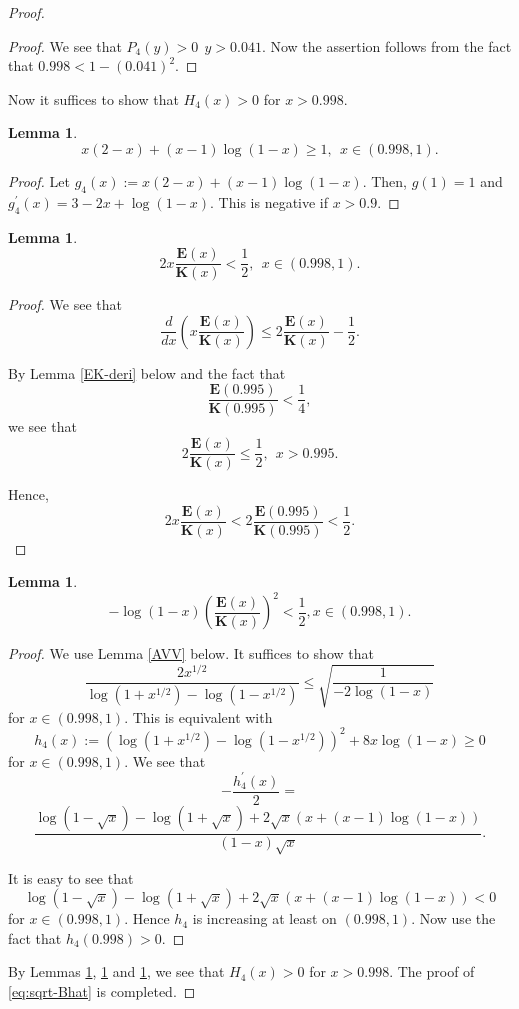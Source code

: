 \documentclass[journal]{IEEEtran}
\newtheorem{lemma}[theorem]{Lemma}
\begin{document}
\begin{proof}
\begin{proof}
We see that 
$
P_4 (y) > 0 \ \ y > 0.041.
$
Now the assertion follows from the fact that 
$0.998 < 1 - (0.041)^{2}$.
\end{proof}

Now it suffices to show that $H_4 (x) > 0$ for $x > 0.998$. 


\begin{lemma}\label{lem:1st}
\[ x(2-x) + (x-1)\log(1-x) \ge 1, \ \ x \in (0.998,1). \]
\end{lemma}

\begin{proof}
Let $g_4(x) := x(2-x) + (x-1)\log(1-x)$. 
Then, $g(1) = 1$ and 
$g_4^{\prime}(x) = 3-2x + \log(1-x)$. 
This is negative if $x > 0.9$. 
\end{proof}

\begin{lemma}\label{lem:2nd}
\[ 2x \frac{\mathbf{E}(x)}{\mathbf{K}(x)} < \frac{1}{2}, \ \ x \in (0.998,1). \]
\end{lemma}

\begin{proof}
We see that 
\[ \frac{d}{dx} \left( x \frac{\mathbf{E}(x)}{\mathbf{K}(x)}\right) \le  2\frac{\mathbf{E}(x)}{\mathbf{K}(x)}  -\frac{1}{2}. \]

By Lemma \ref{EK-deri}  below and the fact that 
\[ \frac{\mathbf{E}(0.995)}{\mathbf{K}(0.995)} < \frac{1}{4},\] 
we see that 
\[  2\frac{\mathbf{E}(x)}{\mathbf{K}(x)}  \le \frac{1}{2}, \ \ x > 0.995. \]

Hence, 
\[ 2x \frac{\mathbf{E}(x)}{\mathbf{K}(x)} < 2 \frac{\mathbf{E}(0.995)}{\mathbf{K}(0.995)} < \frac{1}{2}. \]
\end{proof}


\begin{lemma}\label{lem:3rd}
\[ -\log(1-x) \left( \frac{\mathbf{E}(x)}{\mathbf{K}(x)}  \right)^2 < \frac{1}{2},  x \in (0.998,1). \]
\end{lemma}


\begin{proof}
We use Lemma \ref{AVV} below. 
It suffices to show that 
\[  \frac{2 x^{1/2}}{\log(1+x^{1/2}) - \log(1-x^{1/2})} \le \sqrt{\frac{1}{-2\log(1-x)}}  \]
for $x \in (0.998,1)$. 
This is equivalent with 
\[ h_4(x) := \left( \log(1+x^{1/2}) - \log(1-x^{1/2}) \right)^2 + 8x\log(1-x) \ge 0   \]
for $x \in (0.998,1)$. 
We see that 
\[ -\frac{h_4^{\prime}(x)}{2} = \]
\[\frac{\log(1-\sqrt{x}) - \log(1+\sqrt{x}) + 2\sqrt{x}(x + (x-1)\log(1-x))}{(1-x)\sqrt{x}}. \]

It is easy to see that 
\[ \log(1-\sqrt{x}) - \log(1+\sqrt{x}) + 2\sqrt{x}(x + (x-1)\log(1-x)) < 0  \]
for $x \in (0.998,1)$.
Hence $h_4$ is increasing at least on $(0.998,1)$.  
Now use the fact that $h_4(0.998) > 0$. 
\end{proof}



By Lemmas \ref{lem:1st}, \ref{lem:2nd} and \ref{lem:3rd}, 
we see that $H_4(x) > 0$ for $x > 0.998$. 
The proof of \eqref{eq:sqrt-Bhat} is completed. 
\end{proof}
\end{document}

